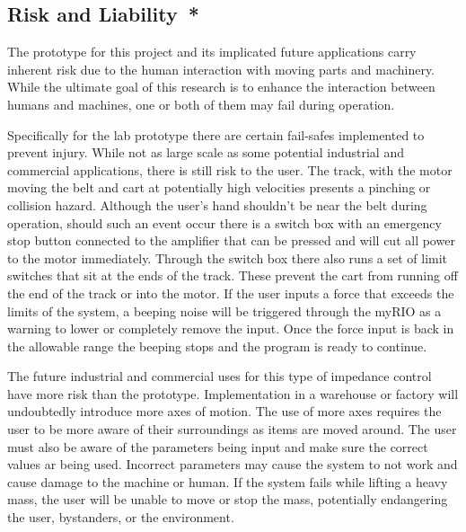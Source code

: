 
\subsection*{Risk and Liability{{\color{red}\ *}}}
The prototype for this project and its implicated future applications carry inherent risk due to the human interaction with moving parts and machinery. While the ultimate goal of this research is to enhance the interaction between humans and machines, one or both of them may fail during operation.

Specifically for the lab prototype there are certain fail-safes implemented to prevent injury. While not as large scale as some potential industrial and commercial applications, there is still risk to the user. The track, with the motor moving the belt and cart at potentially high velocities presents a pinching or collision hazard. Although the user's hand shouldn't be near the belt during operation, should such an event occur there is a switch box with an emergency stop button connected to the amplifier that can be pressed and will cut all power to the motor immediately. Through the switch box there also runs a set of limit switches that sit at the ends of the track. These prevent the cart from running off the end of the track or into the motor. If the user inputs a force that exceeds the limits of the system, a beeping noise will be triggered through the myRIO as a warning to lower or completely remove the input. Once the force input is back in the allowable range the beeping stops and the program is ready to continue.

The future industrial and commercial uses for this type of impedance control have more risk than the prototype. Implementation in a warehouse or factory will undoubtedly introduce more axes of motion. The use of more axes requires the user to be more aware of their surroundings as items are moved around. The user must also be aware of the parameters being input and make sure the correct values ar being used. Incorrect parameters may cause the system to not work and cause damage to the machine or human. If the system fails while lifting a heavy mass, the user will be unable to move or stop the mass, potentially endangering the user, bystanders, or the environment.
